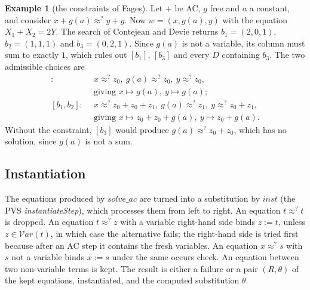 \documentclass[11pt,a4paper]{article}
\theoremstyle{definition}
\newtheorem{example}[theorem]{Example}
\theoremstyle{remark}
\newcommand{\vars}{\mathcal{V}\mathit{ar}}
\begin{document}
\begin{example}[the constraints of Fages]\label{ex:fages}
  Let $+$ be AC, $g$ free and $a$ a constant, and consider $x + g(a) \approx^? y + y$. Now
  $w = (x, g(a), y)$ with the equation $X_1 + X_2 = 2Y$. The search of Contejean and Devie returns
  $b_1 = (2,0,1)$, $b_2 = (1,1,1)$ and $b_3 = (0,2,1)$. Since $g(a)$ is not a variable, its
  column must sum to exactly $1$, which rules out $[b_1]$, $[b_3]$ and every $D$ containing $b_3$.
  The two admissible choices are
  \begin{align*}
    [b_2]:\ &\ x \approx^? z_0,\ g(a) \approx^? z_0,\ y \approx^? z_0,\\
            &\ \text{giving } x \mapsto g(a),\ y \mapsto g(a);\\
    [b_1, b_2]:\ &\ x \approx^? z_0 + z_0 + z_1,\ g(a) \approx^? z_1,\ y \approx^? z_0 + z_1,\\
            &\ \text{giving } x \mapsto z_0 + z_0 + g(a),\ y \mapsto z_0 + g(a).
  \end{align*}
  Without the constraint, $[b_3]$ would produce $g(a) \approx^? z_0 + z_0$, which has no
  solution, since $g(a)$ is not a sum.
\end{example}

\subsection{Instantiation}

The equations produced by $\mathit{solve\_ac}$ are turned into a substitution by
$\mathit{inst}$ (the PVS \emph{instantiateStep}), which processes them from left to right.
An equation $t \approx^? t$ is dropped. An equation $t \approx^? z$ with a variable right-hand
side binds $z := t$, unless $z \in \vars(t)$, in which case the alternative fails; the
right-hand side is tried first because after an AC step it contains the fresh variables. An
equation $x \approx^? s$ with $s$ not a variable binds $x := s$ under the same occurs check. An
equation between two non-variable terms is kept. The result is either a failure or a pair
$(R, \theta)$ of the kept equations, instantiated, and the computed substitution $\theta$.
\end{document}
